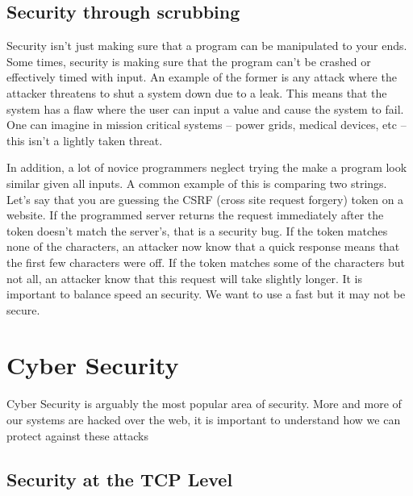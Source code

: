 \subsection{Security through scrubbing}

Security isn't just making sure that a program can be manipulated to your ends.
Some times, security is making sure that the program can't be crashed or effectively timed with input.
An example of the former is any attack where the attacker threatens to shut a system down due to a leak.
This means that the system has a flaw where the user can input a value and cause the system to fail.
One can imagine in mission critical systems -- power grids, medical devices, etc -- this isn't a lightly taken threat.

In addition, a lot of novice programmers neglect trying the make a program look similar given all inputs.
A common example of this is comparing two strings.
Let's say that you are guessing the CSRF (cross site request forgery) token on a website.
If the programmed server returns the request immediately after the token doesn't match the server's, that is a security bug.
If the token matches none of the characters, an attacker now know that a quick response means that the first few characters were off.
If the token matches some of the characters but not all, an attacker know that this request will take slightly longer.
It is important to balance speed an security.
We want to use a fast  but it may not be secure.

\section{Cyber Security}

Cyber Security is arguably the most popular area of security.
More and more of our systems are hacked over the web, it is important to understand how we can protect against these attacks

\subsection{Security at the TCP Level}

